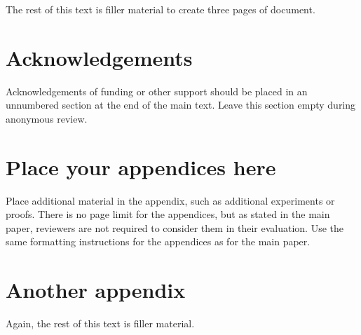 \documentclass{article}
\begin{document}
The rest of this text is filler material to create three pages of document.

\kant[1-5]

\section*{Acknowledgements}

Acknowledgements of funding or other support should be placed in an unnumbered section at the end of the main text. Leave this section empty during anonymous review.




\appendix


\section{Place your appendices here}

Place additional material in the appendix, such as additional experiments or proofs.
There is no page limit for the appendices, but as stated in the main paper, reviewers are not required to consider them in their evaluation.
Use the same formatting instructions for the appendices as for the main paper.


\section{Another appendix}
Again, the rest of this text is filler material.

\kant[1-2]
\end{document}
